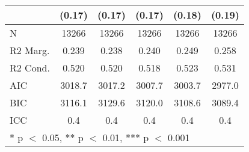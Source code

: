 \begin{tabular}[t]{lccccc}
& (\num{0.17})   & (\num{0.17})   & (\num{0.17})   & (\num{0.18})   & (\num{0.19})   \\
\midrule
N                                & \num{13266}    & \num{13266}    & \num{13266}    & \num{13266}    & \num{13266}    \\
R2 Marg.                                & \num{0.239}    & \num{0.238}    & \num{0.240}    & \num{0.249}    & \num{0.258}    \\
R2 Cond.                                & \num{0.520}    & \num{0.520}    & \num{0.518}    & \num{0.523}    & \num{0.531}    \\
AIC                                     & \num{3018.7}   & \num{3017.2}   & \num{3007.7}   & \num{3003.7}   & \num{2977.0}   \\
BIC                                     & \num{3116.1}   & \num{3129.6}   & \num{3120.0}   & \num{3108.6}   & \num{3089.4}   \\
ICC                                     & \num{0.4}      & \num{0.4}      & \num{0.4}      & \num{0.4}      & \num{0.4}      \\
\bottomrule
\multicolumn{6}{l}{\rule{0pt}{1em}* p $<$ 0.05, ** p $<$ 0.01, *** p $<$ 0.001}\\
\end{tabular}
